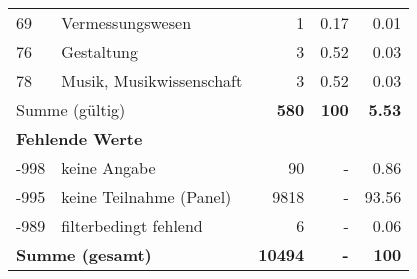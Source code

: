 \begin{longtable}{lXrrr}
        69 & \multicolumn{1}{X}{Vermessungswesen} & %
          \num{1} &
          \num[round-mode=places,round-precision=2]{0.17} &
          \num[round-mode=places,round-precision=2]{0.01} \\

        76 & \multicolumn{1}{X}{Gestaltung} & %
          \num{3} &
          \num[round-mode=places,round-precision=2]{0.52} &
          \num[round-mode=places,round-precision=2]{0.03} \\

        78 & \multicolumn{1}{X}{Musik, Musikwissenschaft} & %
          \num{3} &
          \num[round-mode=places,round-precision=2]{0.52} &
          \num[round-mode=places,round-precision=2]{0.03} \\

     \midrule
     \multicolumn{2}{l}{Summe (gültig)} &
       \textbf{\num{580}} &
     \textbf{\num{100}} &
       \textbf{\num[round-mode=places,round-precision=2]{5.53}} \\
     \multicolumn{5}{l}{\textbf{Fehlende Werte}}\\
       -998 &
       keine Angabe &
         \num{90} &
        - &
         \num[round-mode=places,round-precision=2]{0.86} \\
       -995 &
       keine Teilnahme (Panel) &
         \num{9818} &
        - &
         \num[round-mode=places,round-precision=2]{93.56} \\
       -989 &
       filterbedingt fehlend &
         \num{6} &
        - &
         \num[round-mode=places,round-precision=2]{0.06} \\
     \midrule
     \multicolumn{2}{l}{\textbf{Summe (gesamt)}} &
          \textbf{\num{10494}} &
        \textbf{-} &
        \textbf{\num{100}} \\
     \bottomrule
     \end{longtable}
     
